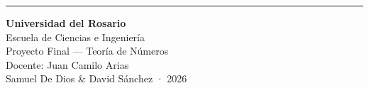 {\begin{minipage}[t]{\dimexpr\linewidth-5mm\relax}
    \vfill
    {\color{Navy!35}\rule{\linewidth}{0.4pt}}
    \vspace{2pt}
    {\tiny\color{Navy!55}
      \textbf{Universidad del Rosario}\\
      Escuela de Ciencias e Ingenier\'ia\\
      Proyecto Final — Teor\'ia de N\'umeros\\
      Docente: Juan Camilo Arias\\[2pt]
      Samuel De Dios \& David S\'anchez · 2026}
  \end{minipage}
}%
